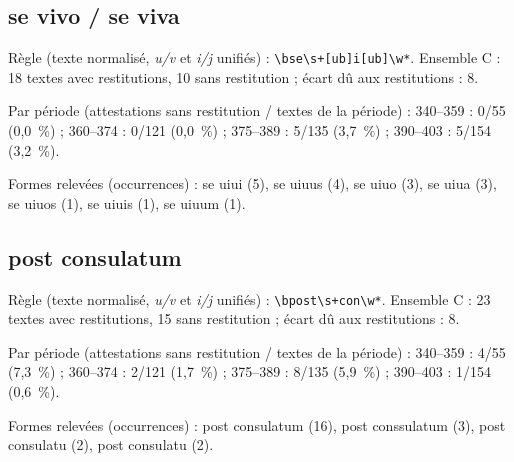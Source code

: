\subsection*{se vivo / se viva}
\noindent Règle (texte normalisé, \textit{u/v} et \textit{i/j} unifiés) : \texttt{\small \textbackslash{}bse\textbackslash{}s+[ub]i[ub]\textbackslash{}w*}. Ensemble C : 18 textes avec restitutions, 10 sans restitution ; écart dû aux restitutions : 8.\par
\noindent Par période (attestations sans restitution / textes de la période) : 340–359 : 0/55 (0,0~\%) ; 360–374 : 0/121 (0,0~\%) ; 375–389 : 5/135 (3,7~\%) ; 390–403 : 5/154 (3,2~\%).\par
\noindent Formes relevées (occurrences) : se uiui (5), se uiuus (4), se uiuo (3), se uiua (3), se uiuos (1), se   uiuis (1), se uiuum (1).\par
{}\par\medskip
\subsection*{post consulatum}
\noindent Règle (texte normalisé, \textit{u/v} et \textit{i/j} unifiés) : \texttt{\small \textbackslash{}bpost\textbackslash{}s+con\textbackslash{}w*}. Ensemble C : 23 textes avec restitutions, 15 sans restitution ; écart dû aux restitutions : 8.\par
\noindent Par période (attestations sans restitution / textes de la période) : 340–359 : 4/55 (7,3~\%) ; 360–374 : 2/121 (1,7~\%) ; 375–389 : 8/135 (5,9~\%) ; 390–403 : 1/154 (0,6~\%).\par
\noindent Formes relevées (occurrences) : post consulatum (16), post conssulatum (3), post   consulatu (2), post consulatu (2).\par
{}\par\medskip
